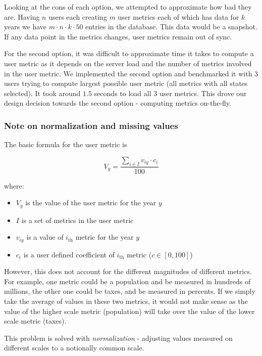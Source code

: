 			Looking at the cons of each option, we attempted to approximate how bad they are.
			Having $n$ users each creating $m$ user metrics each of which has data for $k$ years
			we have $m \cdot n \cdot k \cdot 50$ entries in the database.
			This data would be a snapshot. If any data point in the metrics changes, user metrics remain out of sync.

			For the second option, it was difficult to approximate time it takes to compute a user metric 
			as it depends on the server load and the number of metrics involved in the user metric. 
			We implemented the second option and benchmarked it with $3$ users trying to compute 
			largest possible user metric (all metrics with all states selected). 
			It took around $1.5$ seconds to load all $3$ user metrics. 
			This drove our design decision towards the second option - computing metrics on-the-fly.
			
			\subsubsection{Note on normalization and missing values}
			
				The basic formula for the user metric is
				
				\[
					V_y = \frac{ \sum_{i \in I} v_{iy} \cdot c_i }{100} 
				\]
				
				where:
				\begin{itemize}
					\item
						$V_y$ is the value of the user metric for the year $y$
					\item 
						$I$ is a set of metrics in the user metric
					\item
						$v_{iy}$ is a value of $i_\text{th}$ metric for the year
						$y$
					\item
						$c_i$ is a user defined coefficient of $i_{\text{th}}$ 
						metric ($c \in [0, 100]$) 
				\end{itemize}
				
				However, this does not account for the different magnitudes of different metrics. For example, one metric could be a population and be measured in hundreds of millions, the other one could be taxes, and be measured in percents. If we simply take the average of values in these two metrics, it would not make sense as the value of the higher scale metric (population) will take over the value of the lower scale metric (taxes).

				This problem is solved with \emph{normalization} - adjusting values measured on different scales to a notionally common scale.
				
